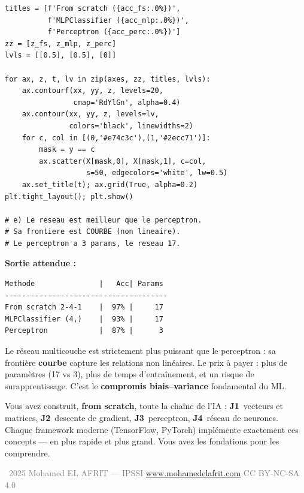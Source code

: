 \begin{pythonbox}
\begin{lstlisting}
titles = [f'From scratch ({acc_fs:.0%})',
          f'MLPClassifier ({acc_mlp:.0%})',
          f'Perceptron ({acc_perc:.0%})']
zz = [z_fs, z_mlp, z_perc]
lvls = [[0.5], [0.5], [0]]

for ax, z, t, lv in zip(axes, zz, titles, lvls):
    ax.contourf(xx, yy, z, levels=20,
                cmap='RdYlGn', alpha=0.4)
    ax.contour(xx, yy, z, levels=lv,
               colors='black', linewidths=2)
    for c, col in [(0,'#e74c3c'),(1,'#2ecc71')]:
        mask = y == c
        ax.scatter(X[mask,0], X[mask,1], c=col,
                   s=50, edgecolors='white', lw=0.5)
    ax.set_title(t); ax.grid(True, alpha=0.2)
plt.tight_layout(); plt.show()

# e) Le reseau est meilleur que le perceptron.
# Sa frontiere est COURBE (non lineaire).
# Le perceptron a 3 params, le reseau 17.
\end{lstlisting}
\end{pythonbox}

\textbf{Sortie attendue :}
\begin{verbatim}
Methode               |   Acc| Params
--------------------------------------
From scratch 2-4-1    |  97% |     17
MLPClassifier (4,)    |  93% |     17
Perceptron            |  87% |      3
\end{verbatim}

\begin{retenirbox}
    Le r\'{e}seau multicouche est strictement plus puissant que le perceptron :
    sa fronti\`{e}re \textbf{courbe} capture les relations non lin\'{e}aires.
    Le prix \`{a} payer : plus de param\`{e}tres (17 vs 3), plus de temps d'entra\^{i}nement,
    et un risque de surapprentissage. C'est le \textbf{compromis biais--variance} fondamental du ML.
\end{retenirbox}

\begin{intuitionbox}
    Vous avez construit, \textbf{from scratch}, toute la cha\^{i}ne de l'IA :
    \textbf{J1}~vecteurs et matrices, \textbf{J2}~descente de gradient,
    \textbf{J3}~perceptron, \textbf{J4}~r\'{e}seau de neurones.
    Chaque framework moderne (TensorFlow, PyTorch) impl\'{e}mente exactement ces concepts
    --- en plus rapide et plus grand. Vous avez les fondations pour les comprendre.
\end{intuitionbox}

\vfill
\begin{center}
    {\footnotesize\sffamily\textcolor{gray}{%
        \textcopyright\ 2025 Mohamed EL AFRIT --- IPSSI \enspace\textbullet\enspace
        \url{www.mohamedelafrit.com} \enspace\textbullet\enspace
        CC BY-NC-SA 4.0
    }}
\end{center}


